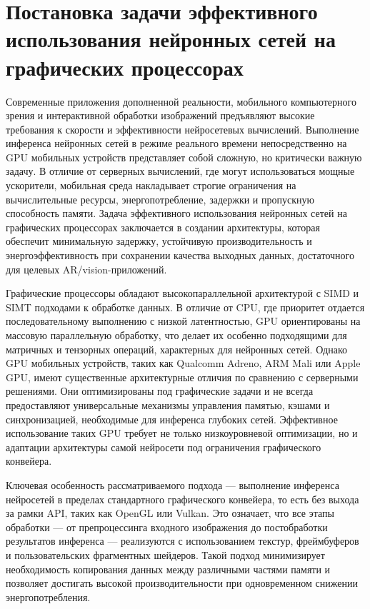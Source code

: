 \documentclass[a4paper,14pt]{extreport}
\begin{document}
        \section{Постановка задачи эффективного использования нейронных сетей на
графических процессорах}
        Современные приложения дополненной реальности, мобильного компьютерного зрения и интерактивной обработки изображений предъявляют высокие требования к скорости и эффективности нейросетевых вычислений. Выполнение инференса нейронных сетей в режиме реального времени непосредственно на GPU мобильных устройств представляет собой сложную, но критически важную задачу. В отличие от серверных вычислений, где могут использоваться мощные ускорители, мобильная среда накладывает строгие ограничения на вычислительные ресурсы, энергопотребление, задержки и пропускную способность памяти. Задача эффективного использования нейронных сетей на графических процессорах заключается в создании архитектуры, которая обеспечит минимальную задержку, устойчивую производительность и энергоэффективность при сохранении качества выходных данных, достаточного для целевых AR/vision-приложений.
        
        Графические процессоры обладают высокопараллельной архитектурой с SIMD и SIMT подходами к обработке данных. В отличие от CPU, где приоритет отдается последовательному выполнению с низкой латентностью, GPU ориентированы на массовую параллельную обработку, что делает их особенно подходящими для матричных и тензорных операций, характерных для нейронных сетей. Однако GPU мобильных устройств, таких как Qualcomm Adreno, ARM Mali или Apple GPU, имеют существенные архитектурные отличия по сравнению с серверными решениями. Они оптимизированы под графические задачи и не всегда предоставляют универсальные механизмы управления памятью, кэшами и синхронизацией, необходимые для инференса глубоких сетей. Эффективное использование таких GPU требует не только низкоуровневой оптимизации, но и адаптации архитектуры самой нейросети под ограничения графического конвейера.
        
        Ключевая особенность рассматриваемого подхода — выполнение инференса нейросетей в пределах стандартного графического конвейера, то есть без выхода за рамки API, таких как OpenGL или Vulkan. Это означает, что все этапы обработки — от препроцессинга входного изображения до постобработки результатов инференса — реализуются с использованием текстур, фреймбуферов и пользовательских фрагментных шейдеров. Такой подход минимизирует необходимость копирования данных между различными частями памяти и позволяет достигать высокой производительности при одновременном снижении энергопотребления.
        
\end{document}
